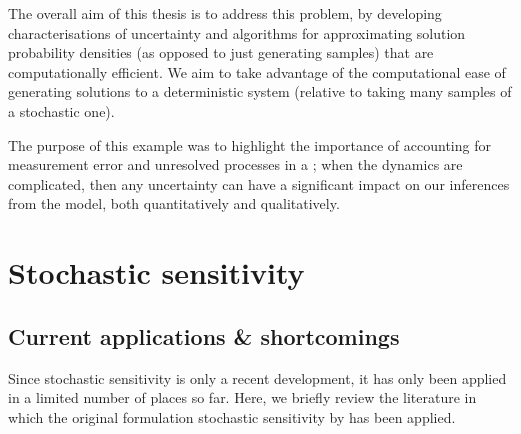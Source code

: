 The overall aim of this thesis is to address this problem, by developing characterisations of uncertainty and algorithms for approximating solution probability densities (as opposed to just generating samples) that are computationally efficient.
We aim to take advantage of the computational ease of generating solutions to a deterministic system (relative to taking many samples of a stochastic one).


The purpose of this example was to highlight the importance of accounting for measurement error and unresolved processes in a ; when the dynamics are complicated, then any uncertainty can have a significant impact on our inferences from the model, both quantitatively and qualitatively.



\section{Stochastic sensitivity}


\subsection{Current applications \& shortcomings}
Since stochastic sensitivity is only a recent development, it has only been applied in a limited number of places so far.
Here, we briefly review the literature in which the original formulation stochastic sensitivity by \citet{Balasuriya_2020_StochasticSensitivityComputable} has been applied.

